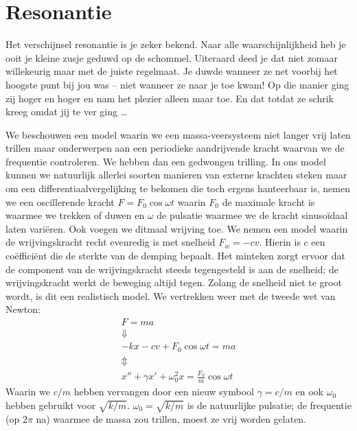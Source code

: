 \documentclass{ximera}
\begin{document}
	\author{Bart Lambregs}
    \xmsource



	\section{Resonantie}

	
	Het verschijnsel resonantie is je zeker bekend. Naar alle waarschijnlijkheid heb je ooit je kleine zusje geduwd op de schommel. Uiteraard deed je dat niet zomaar willekeurig maar met de juiste regelmaat. Je duwde wanneer ze net voorbij het hoogste punt bij jou was -- niet wanneer ze naar je toe kwam! Op die manier ging zij hoger en hoger en nam het plezier alleen maar toe. En dat totdat ze schrik kreeg omdat jij te ver ging \ldots
	
	We beschouwen een model waarin we een massa-veersysteem niet langer vrij laten trillen maar onderwerpen aan een periodieke aandrijvende kracht waarvan we de frequentie controleren. We hebben dan een gedwongen trilling. In ons model kunnen we natuurlijk allerlei soorten manieren van externe krachten steken maar om een differentiaalvergelijking te bekomen die toch ergens hanteerbaar is, nemen we een oscillerende kracht $F=F_0\cos\omega t$ waarin $F_0$ de maximale kracht is waarmee we trekken of duwen en $\omega$ de pulsatie waarmee we de kracht sinuso\"idaal laten vari\"eren. Ook voegen we ditmaal wrijving toe. We nemen een model waarin de wrijvingskracht recht evenredig is met snelheid $F_w=-cv$. Hierin is $c$ een co\"effici\"ent die de sterkte van de demping bepaalt. Het minteken zorgt ervoor dat de component van de wrijvingskracht steeds tegengesteld is aan de snelheid; de wrijvingskracht werkt de beweging altijd tegen. Zolang de snelheid niet te groot wordt, is dit een realistisch model. We vertrekken weer met de tweede wet van Newton:
	\begin{gather}
	F=ma\nonumber\\
	\Downarrow\nonumber\\
	-kx-cv+F_0\cos\omega t=ma\nonumber\\
	\Updownarrow\nonumber\\
	x''+\gamma x'+\omega_0^2x=\frac{F_0}{m}\cos\omega t\label{diffvgl_resonantie}
	\end{gather}
	Waarin we $c/m$ hebben vervangen door een nieuw symbool $\gamma=c/m$ en ook $\omega_0$ hebben gebruikt voor $\sqrt{k/m}$. $\omega_0=\sqrt{k/m}$ is de natuurlijke pulsatie; de frequentie (op $2\pi$ na) waarmee de massa zou trillen, moest ze vrij worden gelaten.
	
\end{document}
